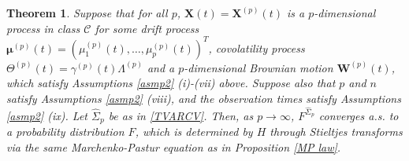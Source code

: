 \documentclass[a4paper,11pt]{book}
\theoremstyle{plain}
\newtheorem{thm}{Theorem}[chapter]%
\theoremstyle{definition}
\begin{document}
    \begin{thm} \label{Thm 2}
    	Suppose that for all $p$, $\mathbf{X}(t) = \mathbf{X}^{(p)}(t)$ is a $p$-dimensional process in class $\mathcal{C}$ for some drift process $\boldsymbol{\mu}^{(p)}(t) = (\mu_1^{(p)}(t), \dots , \mu_p^{(p)}(t))^T$, covolatility process $\Theta^{(p)}(t) = \gamma^{(p)}(t) \Lambda^{(p)}$ and a $p$-dimensional Brownian motion $\mathbf{W}^{(p)}(t)$, which satisfy Assumptions \ref{asmp2} (i)-(vii) above. Suppose also that $p$ and $n$ satisfy Assumptions \ref{asmp2} (viii), and the observation times satisfy Assumptions \ref{asmp2} (ix). Let $\hat{\Sigma}_p$ be as in \eqref{TVARCV}. Then, as $p \rightarrow \infty$, $F^{\hat{\Sigma}_p}$ converges a.s. to a probability distribution $F$, which is determined by $H$ through Stieltjes transforms via the same Marchenko-Pastur equation as in Proposition \ref{MP law}.
    \end{thm}
\end{document}
